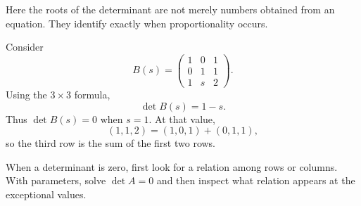 Here the roots of the determinant are not merely numbers obtained from an equation. They identify exactly when proportionality occurs.

\begin{examplebox}
Consider
\[
B(s)=
\begin{pmatrix}
1&0&1\\
0&1&1\\
1&s&2
\end{pmatrix}.
\]
Using the \(3\times3\) formula,
\[
\det B(s)=1-s.
\]
Thus \(\det B(s)=0\) when \(s=1\). At that value,
\[
(1,1,2)=(1,0,1)+(0,1,1),
\]
so the third row is the sum of the first two rows.
\end{examplebox}

\begin{summarybox}
When a determinant is zero, first look for a relation among rows or columns. With parameters, solve \(\det A=0\) and then inspect what relation appears at the exceptional values.
\end{summarybox}
